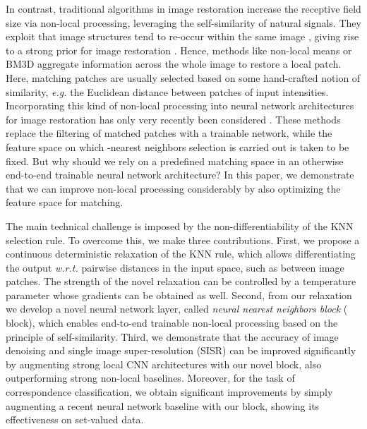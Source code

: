 \documentclass{article}
\makeatletter
\newcommand{\eg}{\emph{e.\thinspace{}g.}\@\xspace}
\newcommand{\wrt}{\emph{w.\thinspace{}r.\thinspace{}t.}\@\xspace}
\makeatother
\begin{document}
In contrast, traditional algorithms in image restoration increase the receptive field size via non-local processing, leveraging the self-similarity of natural signals.
They exploit that image structures tend to re-occur within the same image \cite{Zontak:2011:ISS}, giving rise to a strong prior for image restoration \cite{Lotan:2016:NMR}.
Hence, methods like non-local means \cite{Buades:2005:NLA} or BM3D \cite{Dabov:2006:IDB} aggregate information across the whole image to restore a local patch. 
Here, matching patches are usually selected based on some hand-crafted notion
of similarity, \eg the Euclidean distance between patches of input intensities. 
Incorporating this kind of non-local processing into neural network architectures for image restoration has only very recently been considered \cite{Lefkimmiatis:2017:NLC,Yang:2018:BM3D}. 
These methods replace the filtering of matched patches with a trainable network, while the feature space on which -nearest neighbors selection is carried out is taken to be fixed. 
But why should we rely on a predefined matching space in an otherwise end-to-end trainable neural network architecture? 
In this paper, we demonstrate that we can improve non-local processing
considerably by also optimizing the feature space for matching.

The main technical challenge is imposed by the non-differentiability of the KNN selection rule.
To overcome this, we make three contributions.
First, we propose a continuous deterministic relaxation of the KNN rule,
which allows differentiating the output \wrt pairwise distances in the input space, such as between image patches. 
The strength of the novel relaxation can be controlled by a temperature parameter whose gradients can be obtained as well. 
Second, from our relaxation we develop a novel neural network layer,
called  \emph{neural nearest neighbors block} ( block), which enables end-to-end trainable non-local processing based on the principle
of self-similarity.
Third, we demonstrate that the accuracy of image denoising and single image super-resolution (SISR) can be improved significantly by augmenting strong local CNN architectures with our novel  block, also outperforming strong non-local baselines.
Moreover, for the task of correspondence classification, we obtain significant improvements by simply augmenting a recent neural network baseline with our  block, showing its effectiveness on set-valued data.
\end{document}
